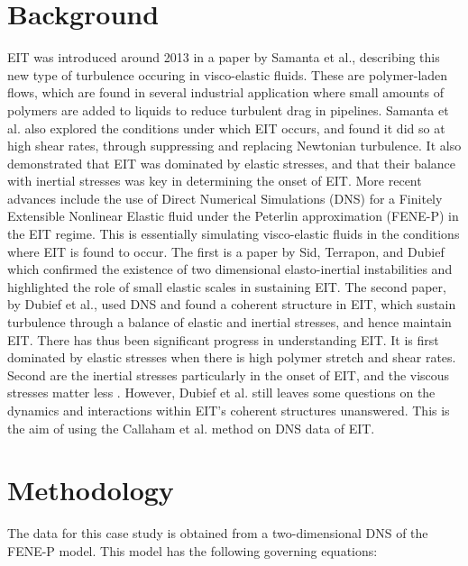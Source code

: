 \documentclass[12pt]{report} %
\begin{document}
\section{Background}

EIT was introduced around 2013 in a paper by Samanta et al.\cite{Samanta2012eit}, describing this new type of turbulence occuring in visco-elastic fluids. These are polymer-laden flows, which are found in several industrial application where small amounts of polymers are added to liquids to reduce turbulent drag in pipelines. Samanta et al.\cite{Samanta2012eit} also explored the conditions under which EIT occurs, and found it did so at high shear rates, through suppressing and replacing Newtonian turbulence. It also demonstrated that EIT was dominated by elastic stresses, and that their balance with inertial stresses was key in determining the onset of EIT. More recent advances include the use of Direct Numerical Simulations (DNS) for a Finitely Extensible Nonlinear Elastic fluid under the Peterlin approximation (FENE-P) in the EIT regime\cite{beneitez2024multistability}. This is essentially simulating visco-elastic fluids in the conditions where EIT is found to occur. The first is a paper by Sid, Terrapon, and Dubief \cite{sid2018two} which confirmed the existence of two dimensional elasto-inertial instabilities and highlighted the role of small elastic scales in sustaining EIT. The second paper, by Dubief et al.\cite{dubief2022first}, used DNS and found a coherent structure in EIT, which sustain turbulence through a balance of elastic and inertial stresses, and hence maintain EIT. There has thus been significant progress in understanding EIT. It is first dominated by elastic stresses when there is high polymer stretch and shear rates. Second are the inertial stresses particularly in the onset of EIT, and the viscous stresses matter less \cite{Samanta2012eit, sid2018two, dubief2022first}. However, Dubief et al.\cite{dubief2022first} still leaves some questions on the dynamics and interactions within EIT's coherent structures unanswered. This is the aim of using the Callaham et al. method on DNS data of EIT\cite{beneitez2024multistability}.

\section{Methodology}

The data for this case study is obtained from a two-dimensional DNS of the FENE-P model. This model has the following governing equations:
\end{document}
